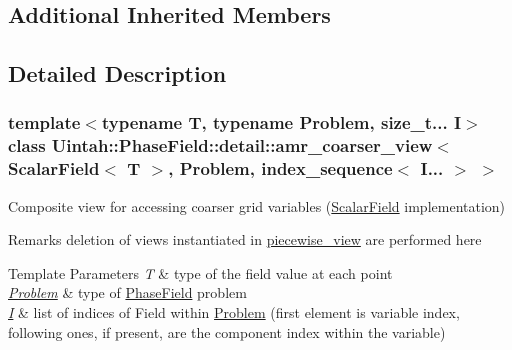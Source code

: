 \subsection*{Additional Inherited Members}


\subsection{Detailed Description}
\subsubsection*{template$<$typename T, typename Problem, size\+\_\+t... I$>$\newline
class Uintah\+::\+Phase\+Field\+::detail\+::amr\+\_\+coarser\+\_\+view$<$ Scalar\+Field$<$ T $>$, Problem, index\+\_\+sequence$<$ I... $>$ $>$}

Composite view for accessing coarser grid variables (\hyperlink{structUintah_1_1PhaseField_1_1ScalarField}{Scalar\+Field} implementation) 

\begin{DoxyRemark}{Remarks}
deletion of views instantiated in \hyperlink{classUintah_1_1PhaseField_1_1detail_1_1piecewise__view}{piecewise\+\_\+view} are performed here
\end{DoxyRemark}

\begin{DoxyTemplParams}{Template Parameters}
{\em T} & type of the field value at each point \\
\hline
{\em \hyperlink{classUintah_1_1PhaseField_1_1Problem}{Problem}} & type of \hyperlink{namespaceUintah_1_1PhaseField}{Phase\+Field} problem \\
\hline
{\em \hyperlink{structUintah_1_1PhaseField_1_1I}{I}} & list of indices of Field within \hyperlink{classUintah_1_1PhaseField_1_1Problem}{Problem} (first element is variable index, following ones, if present, are the component index within the variable) \\
\hline
\end{DoxyTemplParams}


